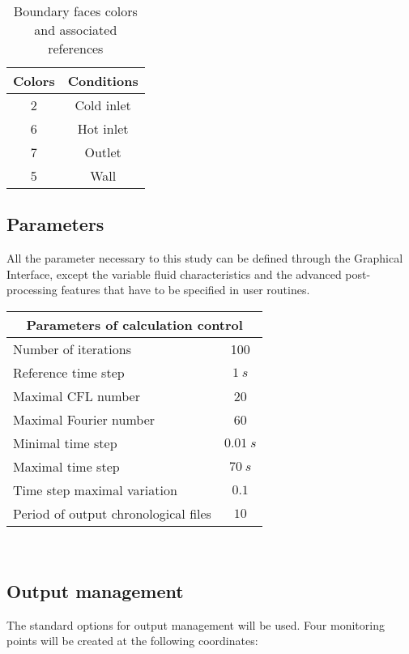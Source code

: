 \begin{table}
\begin{center}
\begin{tabular}{|c|c|}
\hline
Colors & Conditions \\
\hline
2 & Cold inlet \\
\hline
6 & Hot inlet \\
\hline
7 & Outlet \\
\hline
5 & Wall \\
\hline
\end{tabular}
\caption{Boundary faces colors and associated references}
\label{tabante51}
\end{center}
\end{table}


        \subsection{Parameters}
All the parameter necessary to this study can be defined through the Graphical
Interface, except the variable fluid characteristics and the advanced
post-processing features that have to be specified in user routines.


\begin{center}
\begin{tabular}{|l|c|}
\hline
\multicolumn{2}{|c|}{Parameters of calculation control} \\
\hline
Number of iterations & 100 \\
\hline
Reference time step & $1\ s $ \\
\hline
Maximal CFL number & 20 \\
\hline
Maximal Fourier number & 60 \\
\hline
Minimal time step & $0.01\ s$ \\
\hline
Maximal time step & $70\ s$ \\
\hline
Time step maximal variation & $0.1$ \\
\hline
Period of output chronological files & $10$ \\
\hline
\end{tabular}\\
\end{center}



        \subsection{Output management}
The standard options for output management will be used. Four monitoring points
will be created at the following coordinates:

